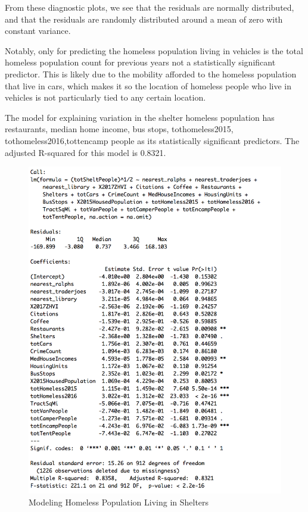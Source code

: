 \documentclass[11pt,letterpaper]{article}
\begin{document}
    From these diagnostic plots, we see that the residuals are normally distributed, and that the residuals are randomly distributed around a mean of zero with constant variance.

Notably, only for predicting the homeless population living in vehicles is the total homeless population count for previous years not a statistically significant predictor. This is likely due to the mobility afforded to the homeless population that live in cars, which makes it so the location of homeless people who live in vehicles is not particularly tied to any certain location.

The model for explaining variation in the shelter homeless population has restaurants, median home income, bus stops, tothomeless2015, tothomeless2016,tottencamp people as its statistically significant predictors.  The adjusted R-squared for this model is 0.8321.


\begin{figure}[H]
\centering
\caption{Modeling Homeless Population Living in Shelters}
\includegraphics[scale=0.75]{predictingShelterHomeless.png}
\end{figure}
\end{document}
